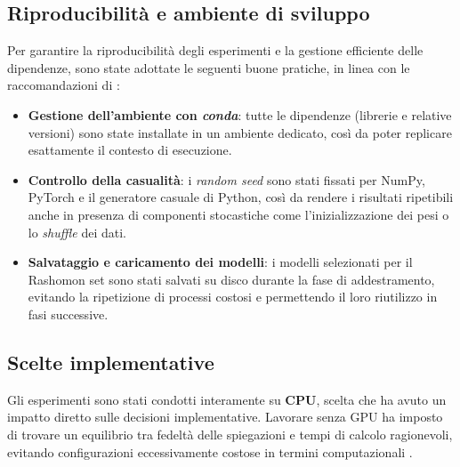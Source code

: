 \documentclass{article}
\begin{document}
\subsection{Riproducibilità e ambiente di sviluppo}
Per garantire la riproducibilità degli esperimenti e la gestione efficiente
delle dipendenze, sono state adottate le seguenti buone pratiche, in linea con
le raccomandazioni di \citet{pineau2020improving}:

\begin{itemize}
      \item \textbf{Gestione dell’ambiente con \emph{conda}}: tutte le dipendenze (librerie e relative versioni) sono state installate in un ambiente dedicato, così da poter replicare esattamente il contesto di esecuzione.
      \item \textbf{Controllo della casualità}: i \emph{random seed} sono stati fissati per NumPy, PyTorch e il generatore casuale di Python, così da rendere i risultati ripetibili anche in presenza di componenti stocastiche come l’inizializzazione dei pesi o lo \emph{shuffle} dei dati.
      \item \textbf{Salvataggio e caricamento dei modelli}: i modelli selezionati per il Rashomon set sono stati salvati su disco durante la fase di addestramento, evitando la ripetizione di processi costosi e permettendo il loro riutilizzo in fasi successive.
\end{itemize}

\subsection{Scelte implementative}
\label{sec:scelte_implementative}

Gli esperimenti sono stati condotti interamente su \textbf{CPU}, scelta che ha
avuto un impatto diretto sulle decisioni implementative. Lavorare senza GPU ha
imposto di trovare un equilibrio tra fedeltà delle spiegazioni e tempi di
calcolo ragionevoli, evitando configurazioni eccessivamente costose in termini
computazionali \citep{leventi2023consistency}.
\end{document}
